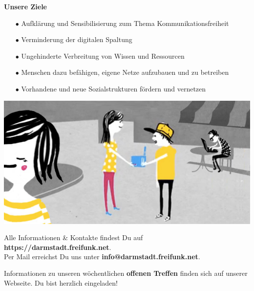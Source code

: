 \documentclass[a4paper]{article}
\begin{document}
\begin{Row}
  \begin{Cell}{5}
    \textbf{Unsere Ziele}\vspace*{-0.35cm}
		\begin{itemize}
			\setlength{\itemindent}{0.5em}
			\item[\textcolor{freifunkpink}{\Large$\bullet$}] Aufklärung und Sensibilisierung zum Thema Kommunikationsfreiheit\vspace*{-0.3cm}
			\item[\textcolor{freifunkpink}{\Large$\bullet$}] Verminderung der digitalen Spaltung\vspace*{-0.3cm}
			\item[\textcolor{freifunkpink}{\Large$\bullet$}] Ungehinderte Verbreitung von Wissen und Ressourcen\vspace*{-0.3cm}
			\item[\textcolor{freifunkpink}{\Large$\bullet$}] Menschen dazu befähigen, eigene Netze aufzubauen und zu betreiben\vspace*{-0.3cm}
			\item[\textcolor{freifunkpink}{\Large$\bullet$}] Vorhandene und neue Sozialstrukturen fördern und vernetzen\vspace*{-0.3cm}
		\end{itemize}
  \end{Cell}
\end{Row}


\begin{center}
	\vspace{.3cm}
	\hspace*{-0.05 \paperwidth}\includegraphics[width=\paperwidth]{../images/community_router}
\end{center}

Alle Informationen \& Kontakte findest Du auf \textbf{https://darmstadt.freifunk.net}.\\
Per Mail erreichst Du uns unter \textbf{info@darmstadt.freifunk.net}.

Informationen zu unseren wöchentlichen \textbf{offenen Treffen} finden sich auf unserer Webseite. Du bist herzlich eingeladen!
\end{document}
